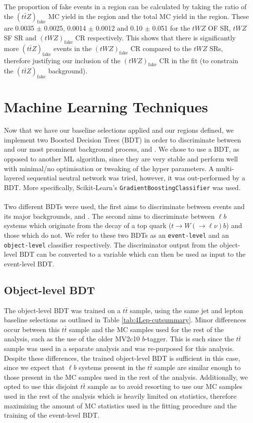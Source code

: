 The proportion of fake events in a region can be calculated by taking the ratio of the $(t\bar{t}Z)_{\text{fake}}$ MC yield in the region and the total MC yield in the region. These are 0.0035 $\pm$ 0.0025, 0.0014 $\pm$ 0.0012 and 0.10 $\pm$ 0.051 for the $tWZ$ OF SR, $tWZ$ SF SR and $(tWZ)_{\text{fake}}$ CR respectively. This shows that there is significantly more $(t\bar{t}Z)_{\text{fake}}$ events in the $(tWZ)_{\text{fake}}$ CR compared to the $tWZ$ SRs, therefore justifying our inclusion of the $(tWZ)_{\text{fake}}$ CR in the fit (to constrain the $(t\bar{t}Z)_{\text{fake}}$ background).

\section{Machine Learning Techniques}
Now that we have our baseline selections applied and our regions defined, we implement two Boosted Decision Trees (BDT) in order to discriminate between \tWZ and our most prominent background process, \ttZ and \ZZ. We chose to use a BDT, as opposed to another ML algorithm, since they are very stable and perform well with minimal/no optimisation or tweaking of the hyper parameters. A multi-layered sequential neutral network was tried, however, it was out-performed by a BDT. More specifically, Scikit-Learn's \texttt{GradientBoostingClassifier} was used.\\\\
Two different BDTs were used, the first aims to discriminate between \tWZ events and its major backgrounds, \ttZ and \ZZ. The second aims to discriminate between $\ell b$ systems which originate from the decay of a top quark ($t\rightarrow W(\rightarrow \ell \nu) b$) and those which do not. We refer to these two BDTs as an \texttt{event-level} and an \texttt{object-level} classifier respectively. The discriminator output from the object-level BDT can be converted to a variable which can then be used as input to the event-level BDT.
\subsection{Object-level BDT}
\label{sec:object-level-bdt}
The object-level BDT was trained on a $t\bar{t}$ sample, using the same jet and lepton baseline selections as outlined in Table \ref{tab:4Lep-cutsummary}. Minor differences occur between this $t\bar{t}$ sample and the MC samples used for the rest of the analysis, such as the use of the older MV2c10 $b$-tagger. This is such since the $t\bar{t}$ sample was used in a separate analysis and was re-purposed for this analysis. Despite these differences, the trained object-level BDT is sufficient in this case, since we expect that $\ell b$ systems present in the $t\bar{t}$ sample are similar enough to those present in the MC samples used in the rest of the analysis. Additionally, we opted to use this disjoint $t\bar{t}$ sample as to avoid resorting to use our MC samples used in the rest of the analysis which is heavily limited on statistics, therefore maximizing the amount of MC statistics used in the fitting procedure and the training of the event-level BDT.\\\\

